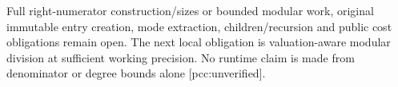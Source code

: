 \documentclass[10pt]{article}
\begin{document}
Full right-numerator construction/sizes or bounded modular work, original
immutable entry creation, mode extraction, children/recursion and public
cost obligations remain open. The next local obligation is valuation-aware
modular division at sufficient working precision. No runtime claim is made
from denominator or degree bounds alone [pcc:unverified].
\end{document}
